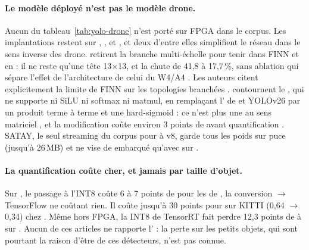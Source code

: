 \paragraph{Le modèle déployé n'est pas le modèle drone.} Aucun  du
tableau~\ref{tab:yolo-drone} n'est porté sur FPGA dans le corpus. Les implantations
restent sur , ,  et , et deux d'entre elles simplifient le
réseau dans le sens inverse des  drone. \citet{2025-cali-optimized-implementation-yolov3-tiny-real}
retirent la branche multi-échelle pour tenir dans FINN et en  : il ne reste qu'une
tête 13$\times$13, et la  chute de 41,8 à 17,7\,\%, sans ablation qui sépare
l'effet de l'architecture de celui du W4/A4 . Les auteurs citent
explicitement la limite de FINN sur les topologies branchées .
\citet{arxiv-2607.13106-no-attention-no-problem-dpu}\pp{} contournent le , qui ne
supporte ni SiLU ni softmax ni matmul, en remplaçant l' de  et YOLOv26
par un produit terme à terme et une hard-sigmoid  : ce n'est plus une
 au sens matriciel \deduit, et la modification coûte environ 3 points de 
avant quantification . SATAY, le seul  streaming du corpus pour
 à v8, garde tous les poids sur puce (jusqu'à 26\,MB) et ne vise de  embarqué
qu'avec  sur 
\citep[§IV-C, Table~IV]{2023-montgomerie-corcoran-satay-streaming-architecture-toolflow-accelerating}.

\paragraph{La quantification coûte cher, et jamais par taille d'objet.} Sur , le
passage à l'INT8 coûte 6 à 7 points de  pour les  de
\citet[Tables~10--11]{2024-nguyen-fpga-soc-implementation-yolov4-flying}, la conversion
 $\rightarrow$ TensorFlow ne coûtant rien. Il coûte jusqu'à 30 points pour 
sur KITTI (0,64 $\rightarrow$ 0,34) chez \citet[Table~II]{arxiv-2607.13106-no-attention-no-problem-dpu}\pp.
Même hors FPGA, la  INT8 de TensorRT fait perdre 12,3 points de  à 
sur  \citep[Table~4]{arxiv-2502.15737-performance-analysis-you-only-look}.
Aucun de ces articles ne rapporte l' : la perte sur les petits objets, qui sont
pourtant la raison d'être de ces détecteurs, n'est pas connue.

